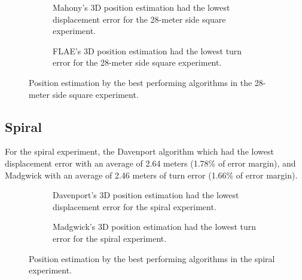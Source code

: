 \begin{figure}[H]
    \centering
    \begin{subfigure}{0.49\textwidth}
        \centering
        \resizebox{1\linewidth}{!}{}
        \caption{Mahony's 3D position estimation had the lowest displacement error for the 28-meter side square experiment.}
        \label{fig:square282D}
    \end{subfigure}
    \begin{subfigure}{0.49\textwidth}
        \centering
        \resizebox{1\linewidth}{!}{}
        \caption{FLAE's 3D position estimation had the lowest turn error for the 28-meter side square experiment.}
        \label{fig:square283D}
    \end{subfigure}
    \caption{Position estimation by the best performing algorithms in the 28-meter side square experiment.}
    \label{fig:square28}
\end{figure}

\subsection{Spiral}

For the spiral experiment, the Davenport algorithm which had the lowest displacement error with an average of 2.64 meters (1.78\% of error margin), and Madgwick with an average of 2.46 meters of turn error (1.66\% of error margin).

\vspace{-0.5cm}

\vspace{-1.5cm}

\begin{figure}[H]
    \centering
    \begin{subfigure}{0.49\textwidth}
        \centering
        \resizebox{1\linewidth}{!}{}
        \caption{Davenport's 3D position estimation had the lowest displacement error for the spiral experiment.}
        \label{fig:spiral2D}
    \end{subfigure}
    \begin{subfigure}{0.49\textwidth}
        \centering
        \resizebox{1\linewidth}{!}{}
        \caption{Madgwick's 3D position estimation had the lowest turn error for the spiral experiment.}
        \label{fig:spiral3D}
    \end{subfigure}
    \caption{Position estimation by the best performing algorithms in the spiral experiment.}
    \label{fig:spiral}
\end{figure}

